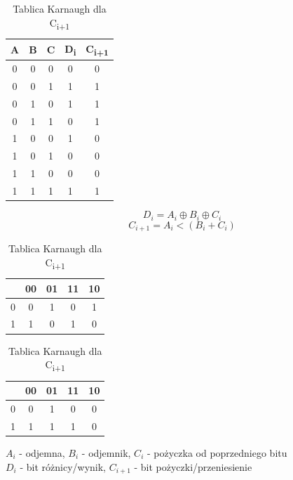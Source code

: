 \documentclass[12pt,a4paper]{article}
\begin{document}
			\begin{table}[h]
				\begin{minipage}{.5\textwidth}
					\caption{Tabela Prawdy}
					\vspace{0.2cm}
					\centering
					\begin{tabular}{ccc|c|c}
						A&B&C&D\textsubscript{i}&C\textsubscript{i+1}\\\hline
						0&0&0&0&0\\
						0&0&1&1&1\\
						0&1&0&1&1\\
						0&1&1&0&1\\\hline
						1&0&0&1&0\\
						1&0&1&0&0\\
						1&1&0&0&0\\
						1&1&1&1&1\\
					\end{tabular}
					\begin{displaymath}
					D_i = A_i \oplus B_i \oplus C_i
					\end{displaymath}
					\begin{displaymath}
					C_{i+1} = A_i < (B_i + C_i)
					\end{displaymath}
				\end{minipage}%
				\begin{minipage}{.5\textwidth}
					\caption{Tablica Karnaugh dla D\textsubscript{i}}
					\vspace{0.2cm}
					\centering
					\begin{tabular}{c|c|c|c|c}
						\backslashbox{C}{AB}&00&01&11&10\\\hline
						0&0&1&0&1\\\hline
						1&1&0&1&0\\
					\end{tabular}
					\vspace{0.4cm}
					\caption{Tablica Karnaugh dla C\textsubscript{i+1}}
					\vspace{0.2cm}
					\centering
					\begin{tabular}{c|c|c|c|c}
						\backslashbox{C}{AB}&00&01&11&10\\\hline
						0&0&1&0&0\\\hline
						1&1&1&1&0\\
					\end{tabular} 
				\end{minipage} 
			\end{table}
			
			\noindent
			$A_i$ - odjemna, $B_i$ - odjemnik, $C_i$ - pożyczka od poprzedniego bitu\\
			$D_i$ - bit różnicy/wynik, $C_{i+1}$ - bit pożyczki/przeniesienie
				
\end{document}
